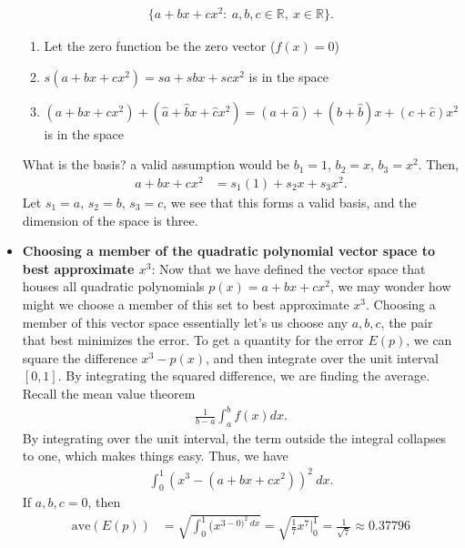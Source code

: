 \documentclass{report}
\begin{document}
\begin{itemize}
\begin{align*}
                \{
                    a + bx + cx^{2}:\ a,b,c \in \mathbb{R},\ x\in\mathbb{R}
                \}
            .\end{align*}
            \bigbreak \noindent 
            \begin{enumerate}
                \item Let the zero function be the zero vector ($f(x) = 0$)
                \item $s(a+bx+cx^{2}) = sa+sbx + scx^{2}$ is in the space
                \item $(a + bx +cx^{2}) + (\hat{a} + \hat{b}x + \hat{c}x^{2}) = (a + \hat{a}) + (b + \hat{b})x + (c + \hat{c})x^{2}$ is in the space
            \end{enumerate}
            What is the basis? a valid assumption would be $b_{1} = 1$, $b_{2} = x$, $b_{3} = x^{2}$. Then,
            \begin{align*}
                a + bx + cx^{2} &= s_1 (1) + s_2x + s_3x^{2}
            .\end{align*}
            Let $s_1 = a$, $s_2 = b$, $s_3  = c$, we see that this forms a valid basis, and the dimension of the space is three.
        \item \textbf{Choosing a member of the quadratic polynomial vector space to best approximate $x^{3}$}: Now that we have defined the vector space that houses all quadratic polynomials $p(x) = a + bx + cx^{2}$, we may wonder how might we choose a member of this set to best approximate $x^{3}$. Choosing a member of this vector space essentially let's us choose any $a,b,c$, the pair that best minimizes the error.
            \bigbreak \noindent 
            To get a quantity for the error $E(p)$, we can square the difference $x^{3} - p(x)$, and then integrate over the unit interval $[0,1]$. By integrating the squared difference, we are finding the average. Recall the mean value theorem 
            \begin{align*}
                \frac{1}{b-a}\int_a^{b}f(x)dx
            .\end{align*}
            By integrating over the unit interval, the term outside the integral collapses to one, which makes things easy. Thus, we have
            \begin{align*}
                \int_0^{1} (x^{3} - (a+bx + cx^{2}))^{2}\ dx
            .\end{align*}
            \bigbreak \noindent 
            If $a,b,c  = 0$, then 
            \begin{align*}
                \text{ave}(E(p)) &= \sqrt{\int_0^{1} (x^{3 - 0)^{2} \ dx}} = \sqrt{ \frac{1}{7}x^{7}\bigg|_0^{1}} =\frac{1}{\sqrt{7}} \approx 0.37796

\end{align*}
\end{itemize}
\end{document}
